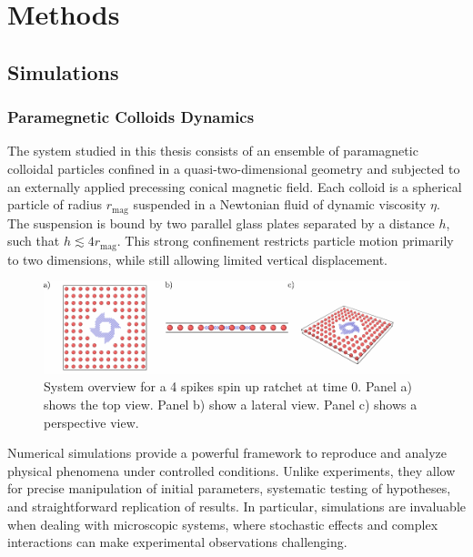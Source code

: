 \part{Methods}
\label{part:methods}

\chapter{Simulations}

\section{Paramegnetic Colloids Dynamics}

The system studied in this thesis consists of an ensemble of paramagnetic colloidal particles confined in a quasi-two-dimensional geometry and subjected to an externally applied precessing conical magnetic field. Each colloid is a spherical particle of radius $r_{\mathrm{mag}}$ suspended in a Newtonian fluid of dynamic viscosity $\eta$. The suspension is bound by two parallel glass plates separated by a distance $h$, such that $h \lesssim 4r_{\mathrm{mag}}$. This strong confinement restricts particle motion primarily to two dimensions, while still allowing limited vertical displacement. 

\begin{figure}
  \begin{center}
    \includegraphics[width=0.95\textwidth]{figures/system.pdf}
  \end{center}
  \caption[System overview.]{System overview for a 4 spikes spin up ratchet at time 0. Panel a) shows the top view. Panel b) show a lateral view. Panel c) shows a perspective view.}\label{fig:system}
\end{figure}



Numerical simulations provide a powerful framework to reproduce and analyze physical phenomena under controlled conditions. Unlike experiments, they allow for precise manipulation of initial parameters, systematic testing of hypotheses, and straightforward replication of results. In particular, simulations are invaluable when dealing with microscopic systems, where stochastic effects and complex interactions can make experimental observations challenging. 


